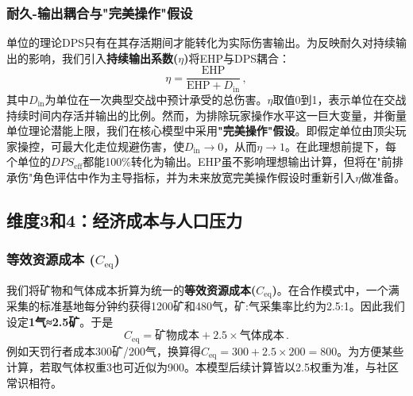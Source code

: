\documentclass[a4paper,12pt]{article}
\begin{document}
\begin{CJK}{UTF8}{gbsn}
\subsubsection{耐久-输出耦合与"完美操作"假设}
单位的理论DPS只有在其存活期间才能转化为实际伤害输出。为反映耐久对持续输出的影响，我们引入\textbf{持续输出系数($\eta$)}将EHP与DPS耦合：
\[
\eta = \frac{\text{EHP}}{\text{EHP} + D_{\text{in}}}\,,
\]
其中$D_{\text{in}}$为单位在一次典型交战中预计承受的总伤害。$\eta$取值0到1，表示单位在交战持续时间内存活并输出的比例。然而，为排除玩家操作水平这一巨大变量，并衡量单位理论潜能上限，我们在核心模型中采用\textbf{"完美操作"假设}。即假定单位由顶尖玩家操控，可最大化走位规避伤害，使$D_{\text{in}}\to0$，从而$\eta\to1$。在此理想前提下，每个单位的$DPS_{\text{eff}}$都能100\%转化为输出。EHP虽不影响理想输出计算，但将在"前排承伤"角色评估中作为主导指标，并为未来放宽完美操作假设时重新引入$\eta$做准备。

\subsection{维度3和4：经济成本与人口压力}
\subsubsection{等效资源成本 ($C_{\text{eq}}$)}
我们将矿物和气体成本折算为统一的\textbf{等效资源成本($C_{\text{eq}}$)}。在合作模式中，一个满采集的标准基地每分钟约获得1200矿和480气，矿:气采集率比约为2.5:1。因此我们设定\textbf{1气≈2.5矿}。于是
\[
C_{\text{eq}} = \text{矿物成本} + 2.5 \times \text{气体成本}\,.
\]
例如天罚行者成本300矿/200气，换算得$C_{\text{eq}}=300+2.5\times200=800$。为方便某些计算，若取气体权重3也可近似为900。本模型后续计算皆以2.5权重为准，与社区常识相符。


\end{CJK}
\end{document}
